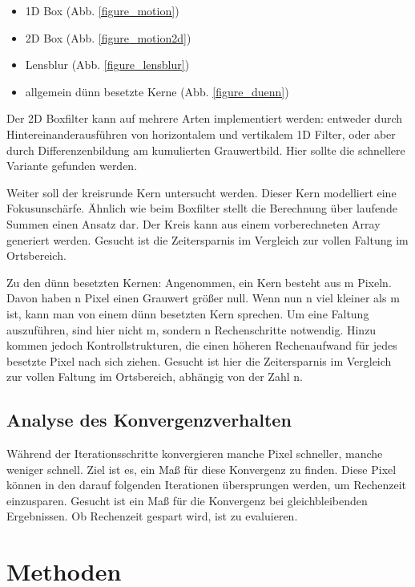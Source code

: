 \documentclass[a4paper,12pt]{article}
\begin{document}
\begin{itemize}
  \itemsep -1pt 
  \item 1D Box (Abb. \ref{figure_motion})
  \item 2D Box (Abb. \ref{figure_motion2d})
  \item Lensblur (Abb. \ref{figure_lensblur})
  \item allgemein dünn besetzte Kerne (Abb. \ref{figure_duenn})
\end{itemize}
Der 2D Boxfilter kann auf mehrere Arten implementiert werden: 
entweder durch Hintereinanderausführen von horizontalem und vertikalem
1D Filter, oder aber durch Differenzenbildung am kumulierten Grauwertbild.
Hier sollte die schnellere Variante gefunden werden.

Weiter soll der kreisrunde Kern untersucht werden. Dieser Kern modelliert eine
Fokusunschärfe. Ähnlich wie beim Boxfilter stellt die Berechnung über laufende
Summen einen Ansatz dar. Der Kreis kann aus einem vorberechneten Array generiert
werden. Gesucht ist die Zeitersparnis im Vergleich zur vollen
Faltung im Ortsbereich.

Zu den dünn besetzten Kernen: Angenommen, ein Kern besteht aus m Pixeln. Davon
haben n Pixel einen Grauwert größer null. Wenn nun n viel kleiner als m ist,
kann man von einem dünn besetzten Kern sprechen. Um eine Faltung auszuführen,
sind hier nicht m, sondern n Rechenschritte notwendig. Hinzu kommen jedoch
Kontrollstrukturen, die einen höheren Rechenaufwand für jedes besetzte Pixel
nach sich ziehen.
Gesucht ist hier die Zeitersparnis im Vergleich zur vollen Faltung im
Ortsbereich, abhängig von der Zahl n.

\subsection{Analyse des Konvergenzverhalten} \label{chp:ziel2}
Während der Iterationsschritte konvergieren manche Pixel schneller, manche
weniger schnell. Ziel ist es, ein Maß für diese Konvergenz zu finden. Diese Pixel können in den darauf folgenden Iterationen 
übersprungen werden, um Rechenzeit einzusparen.
Gesucht ist ein Maß für die Konvergenz bei gleichbleibenden Ergebnissen.
Ob Rechenzeit gespart wird, ist zu evaluieren.


 
\newpage
 
\section{Methoden}
\end{document}
